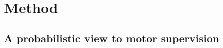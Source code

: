 \documentclass[runningheads]{llncs}
\begin{document}


\section{Method}

\subsection{A probabilistic view to motor supervision}
\end{document}
